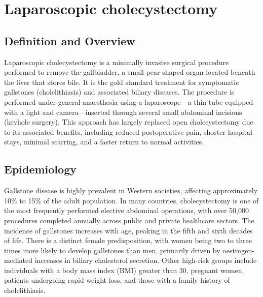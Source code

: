 \chapter{Laparoscopic cholecystectomy}

\section*{Definition and Overview}
Laparoscopic cholecystectomy is a minimally invasive surgical procedure performed to remove the gallbladder, a small pear-shaped organ located beneath the liver that stores bile. It is the gold standard treatment for symptomatic gallstones (cholelithiasis) and associated biliary diseases. The procedure is performed under general anaesthesia using a laparoscope—a thin tube equipped with a light and camera—inserted through several small abdominal incisions (keyhole surgery). This approach has largely replaced open cholecystectomy due to its associated benefits, including reduced postoperative pain, shorter hospital stays, minimal scarring, and a faster return to normal activities.

\section*{Epidemiology}
Gallstone disease is highly prevalent in Western societies, affecting approximately 10\% to 15\% of the adult population. In many countries, cholecystectomy is one of the most frequently performed elective abdominal operations, with over 50,000 procedures completed annually across public and private healthcare sectors. The incidence of gallstones increases with age, peaking in the fifth and sixth decades of life. There is a distinct female predisposition, with women being two to three times more likely to develop gallstones than men, primarily driven by oestrogen-mediated increases in biliary cholesterol secretion. Other high-risk groups include individuals with a body mass index (BMI) greater than 30, pregnant women, patients undergoing rapid weight loss, and those with a family history of cholelithiasis.

